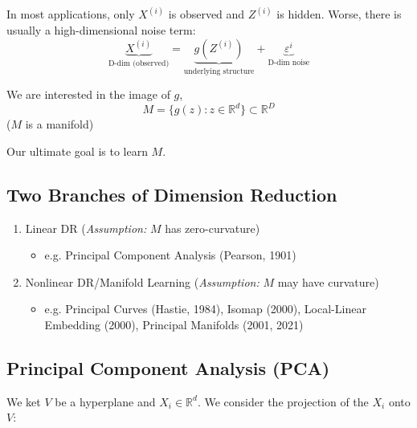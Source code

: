 \documentclass[12pt]{article}
\newcommand{\R}{\mathbb{R}}
\newcommand{\abs}[1]{\left\vert #1 \right\vert}
\begin{document}
        In most applications, only $X^{(i)}$ is observed and $Z^{(i)}$ is hidden. Worse, there is usually a high-dimensional noise term:
        \[\underbrace{X^{(i)}}_{\text{D-dim (observed)}} = \underbrace{g(Z^{(i)})}_{\text{underlying structure}} + \underbrace{\varepsilon^i}_{\text{D-dim noise}}\]

        We are interested in the image of $g$, 
        \[M = \{g(z) : z \in \R^d\} \subset \R^D\]
        ($M$ is a manifold)

        Our ultimate goal is to learn $M$. 

    \subsection{Two Branches of Dimension Reduction}
        \begin{enumerate}
            \item Linear DR (\emph{Assumption:} $M$ has zero-curvature)
                \begin{itemize}
                    \item e.g. Principal Component Analysis (Pearson, 1901)
                \end{itemize}

            \item Nonlinear DR/Manifold Learning (\emph{Assumption:} $M$ may have curvature)
                \begin{itemize}
                    \item e.g. Principal Curves (Hastie, 1984), Isomap (2000), Local-Linear Embedding (2000), Principal Manifolds (2001, 2021)
                \end{itemize}
        \end{enumerate}

    \subsection{Principal Component Analysis (PCA)}
        We ket $V$ be a hyperplane and $X_i \in \R^d$. We consider the projection of the $X_i$ onto $V$:
        
        \begin{center}
        \end{center}
\end{document}
